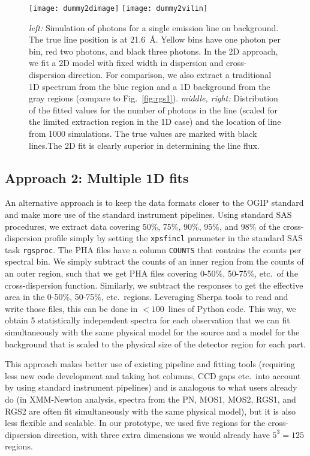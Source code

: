 \documentclass[fleqn,12pt,onecolumn]{SelfArx} %
\begin{document}


\begin{figure}
    \texttt{[image: dummy2dimage]}
    \texttt{[image: dummy2vilin]}
    \caption{\emph{left:} Simulation of photons for a single emission line on background. The true line position is at 21.6~\AA{}. Yellow bins have one photon per bin, red two photons, and black three photons. In the 2D approach, we fit a 2D model with fixed width in dispersion and cross-dispersion direction. For comparison, we also extract a traditional 1D spectrum from the blue region and a 1D background from the gray regions (compare to Fig.~\ref{fig:rgs1}). \emph{middle, right:} Distribution of the fitted values for the number of photons in the line (scaled for the limited extraction region in the 1D case) and the location of line from 1000 simulations. The true values are marked with black lines.The 2D fit is clearly superior in determining the line flux.
    \label{fig:toy2d}}
\end{figure}


\subsection{Approach 2: Multiple 1D fits}

An alternative approach is to keep the data formats closer to the OGIP standard and make more use of the standard instrument pipelines. Using standard SAS procedures, we extract data covering 50\%, 75\%, 90\%, 95\%, and 98\% of the cross-dispersion profile simply by setting the \texttt{xpsfincl} parameter in the standard SAS task \texttt{rgsproc}. The PHA files have a column \texttt{COUNTS} that contains the counts per spectral bin. We simply subtract the counts of an inner region from the counts of an outer region, such that we get PHA files covering 0-50\%, 50-75\%, etc.\ of the cross-dispersion function. Similarly, we subtract the responses to get the effective area in the 0-50\%, 50-75\%, etc.\ regions. Leveraging Sherpa tools to read and write those files, this can be done in $<100$~lines of Python code. This way, we obtain 5 statistically independent spectra for each observation that we can fit simultaneously with the same physical model for the source and a model for the background that is scaled to the physical size of the detector region for each part.

This approach makes better use of existing pipeline and fitting tools (requiring less new code development and taking hot columns, CCD gaps etc.\ into account by using standard instrument pipelines) and is analogous to what users already do (in XMM-Newton analysis, spectra from the PN, MOS1, MOS2, RGS1, and RGS2 are often fit simultaneously with the same physical model), but it is also less flexible and scalable. In our prototype, we used five regions for the cross-dipsersion direction, with three extra dimensions we would already have $5^3=125$ regions.
\end{document}
